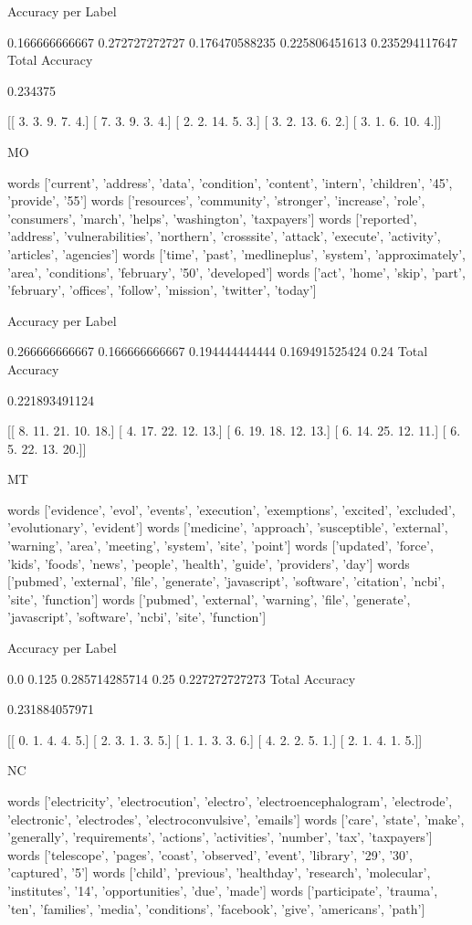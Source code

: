 \documentclass[11pt]{article}
\begin{document}
\begin{verbatium}
Accuracy per Label

0.166666666667
0.272727272727
0.176470588235
0.225806451613
0.235294117647
Total Accuracy

0.234375


[[  3.   3.   9.   7.   4.]
 [  7.   3.   9.   3.   4.]
 [  2.   2.  14.   5.   3.]
 [  3.   2.  13.   6.   2.]
 [  3.   1.   6.  10.   4.]]


MO


words
['current', 'address', 'data', 'condition', 'content', 'intern', 'children', '45', 'provide', '55']
words
['resources', 'community', 'stronger', 'increase', 'role', 'consumers', 'march', 'helps', 'washington', 'taxpayers']
words
['reported', 'address', 'vulnerabilities', 'northern', 'crosssite', 'attack', 'execute', 'activity', 'articles', 'agencies']
words
['time', 'past', 'medlineplus', 'system', 'approximately', 'area', 'conditions', 'february', '50', 'developed']
words
['act', 'home', 'skip', 'part', 'february', 'offices', 'follow', 'mission', 'twitter', 'today']

Accuracy per Label

0.266666666667
0.166666666667
0.194444444444
0.169491525424
0.24
Total Accuracy

0.221893491124


[[  8.  11.  21.  10.  18.]
 [  4.  17.  22.  12.  13.]
 [  6.  19.  18.  12.  13.]
 [  6.  14.  25.  12.  11.]
 [  6.   5.  22.  13.  20.]]


MT


words
['evidence', 'evol', 'events', 'execution', 'exemptions', 'excited', 'excluded', 'evolutionary', 'evident']
words
['medicine', 'approach', 'susceptible', 'external', 'warning', 'area', 'meeting', 'system', 'site', 'point']
words
['updated', 'force', 'kids', 'foods', 'news', 'people', 'health', 'guide', 'providers', 'day']
words
['pubmed', 'external', 'file', 'generate', 'javascript', 'software', 'citation', 'ncbi', 'site', 'function']
words
['pubmed', 'external', 'warning', 'file', 'generate', 'javascript', 'software', 'ncbi', 'site', 'function']

Accuracy per Label

0.0
0.125
0.285714285714
0.25
0.227272727273
Total Accuracy

0.231884057971


[[ 0.  1.  4.  4.  5.]
 [ 2.  3.  1.  3.  5.]
 [ 1.  1.  3.  3.  6.]
 [ 4.  2.  2.  5.  1.]
 [ 2.  1.  4.  1.  5.]]


NC


words
['electricity', 'electrocution', 'electro', 'electroencephalogram', 'electrode', 'electronic', 'electrodes', 'electroconvulsive', 'emails']
words
['care', 'state', 'make', 'generally', 'requirements', 'actions', 'activities', 'number', 'tax', 'taxpayers']
words
['telescope', 'pages', 'coast', 'observed', 'event', 'library', '29', '30', 'captured', '5']
words
['child', 'previous', 'healthday', 'research', 'molecular', 'institutes', '14', 'opportunities', 'due', 'made']
words
['participate', 'trauma', 'ten', 'families', 'media', 'conditions', 'facebook', 'give', 'americans', 'path']


\end{verbatium}
\end{document}
